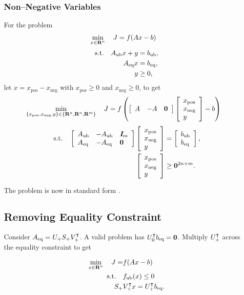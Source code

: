 \documentclass{article}
\begin{document}
\subsubsection{Non--Negative Variables}

    For the problem 
    \begin{align*}
        \min_{x\in\textbf{R}^n}\quad J&=f(Ax-b)
    \end{align*}
    \begin{align*}
        \text{s.t.}\quad A_{\text{ub}} x+y&= b_{\text{ub}},\\
        A_{\text{eq}} x &= b_{\text{eq}},\\
        y&\geq0,
    \end{align*}
    let $x=x_{\text{pos}}-x_{\text{neg}}$ with $x_{\text{pos}}\geq0$ and $x_{\text{neg}}\geq0$, to get
    \begin{align*}
        \min_{\{x_{\text{pos}},x_{\text{neg}},y\}\in\{\textbf{R}^n,\textbf{R}^n,\textbf{R}^m\}}\quad J&=f\left(\left[\begin{array}{lllllllllllllllllll}A &-A & \textbf{0}\end{array}\right] \left[\begin{array}{lllllllllllllllllll}x_{\text{pos}}\\x_{\text{neg}}\\y\end{array}\right] -b\right)
    \end{align*}
    \begin{align*}
        \text{s.t.}\quad \left[\begin{array}{lllllllllllllllllll}A_{\text{ub}} & -A_{\text{ub}} & \emph{\textbf{I}}_m \\ A_{\text{eq}} & -A_{\text{eq}} & \textbf{0} \end{array}\right]\left[\begin{array}{lllllllllllllllllll}x_{\text{pos}}\\x_{\text{neg}}\\y\end{array}\right]&=
    \left[\begin{array}{lllllllllllllllllll}b_{\text{ub}}\\b_{\text{eq}}\end{array}\right],\\
        \left[\begin{array}{lllllllllllllllllll}x_{\text{pos}}\\x_{\text{neg}}\\y\end{array}\right]&\geq\textbf{0}^{2n+m}.
    \end{align*}

    The problem is now in standard form \cite[p.~147]{bv_cvxbook}.

\clearpage

\subsection{Removing Equality Constraint}\label{sec:rm_eq}

    Consider $A_{\text{eq}} = U_+S_+V_+^\intercal$.
    A valid problem has $U_0^\intercal b_{\text{eq}} = \textbf{0}$.
    Multiply $U_+^\intercal$ across the equality constraint to get

    \begin{align*}
        \min_{x\in\textbf{R}^n}\quad J = &f(Ax-b)\\
        \text{s.t.} \quad &f_{\text{ub}}(x)\leq 0\\
        S_+&V_+^\intercal x = U_+^\intercal b_{\text{eq}}.
    \end{align*}
\end{document}
